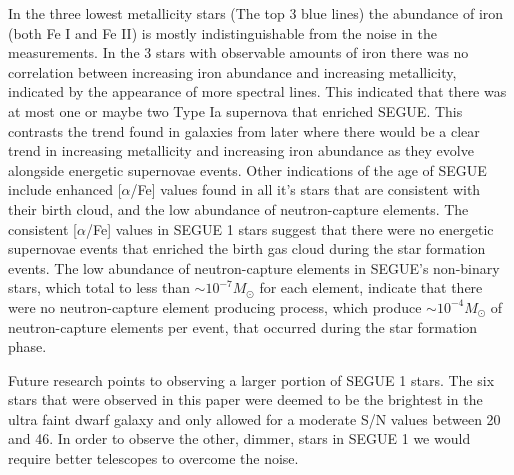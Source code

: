 \documentclass{aastex63}
\begin{document}
In the three lowest metallicity stars (The top 3 blue lines) the abundance of iron (both Fe I and Fe II) is mostly indistinguishable
from the noise in the measurements. In the 3 stars with observable amounts of iron there was no correlation between increasing
iron abundance and increasing metallicity, indicated by the appearance of more spectral lines. This indicated that there was at most one or maybe two Type Ia supernova that enriched SEGUE. This
contrasts the trend found in galaxies from later where there would be a clear trend in increasing metallicity and increasing
iron abundance as they evolve alongside energetic supernovae events. Other indications of the age of SEGUE include enhanced
[$\alpha$/Fe] values found in all it's stars that are consistent with their birth cloud, and the low abundance of neutron-capture
elements. The consistent [$\alpha$/Fe] values in SEGUE 1 stars suggest that there were no energetic supernovae events that enriched
the birth gas cloud during the star formation events. The low abundance of neutron-capture elements in SEGUE's non-binary stars,
which total to less than \(\sim 10^{-7} M_{\odot}\) for each element, indicate that there were no neutron-capture element producing
process, which produce \(\sim 10^{-4} M_{\odot}\) of neutron-capture elements per event, that occurred during the star formation phase.

Future research points to observing a larger portion of SEGUE 1 stars. The six stars that were observed in this paper were deemed to
be the brightest in the ultra faint dwarf galaxy and only allowed for a moderate S/N values between 20 and 46. In order to observe the other, dimmer,
stars in SEGUE 1 we would require better telescopes to overcome the noise.


\nocite{*}
{}



\end{document}
